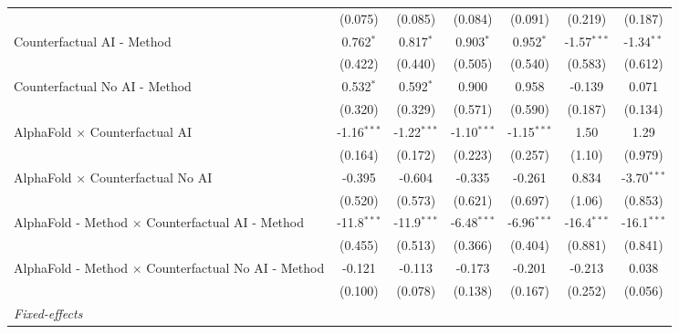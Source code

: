 \begin{tabular}{lcccccc}
                                                              & (0.075)       & (0.085)       & (0.084)       & (0.091)       & (0.219)       & (0.187)\\   
   Counterfactual AI - Method                                 & 0.762$^{*}$   & 0.817$^{*}$   & 0.903$^{*}$   & 0.952$^{*}$   & -1.57$^{***}$ & -1.34$^{**}$\\   
                                                              & (0.422)       & (0.440)       & (0.505)       & (0.540)       & (0.583)       & (0.612)\\   
   Counterfactual No AI - Method                              & 0.532$^{*}$   & 0.592$^{*}$   & 0.900         & 0.958         & -0.139        & 0.071\\   
                                                              & (0.320)       & (0.329)       & (0.571)       & (0.590)       & (0.187)       & (0.134)\\   
   AlphaFold $\times$ Counterfactual AI                       & -1.16$^{***}$ & -1.22$^{***}$ & -1.10$^{***}$ & -1.15$^{***}$ & 1.50          & 1.29\\   
                                                              & (0.164)       & (0.172)       & (0.223)       & (0.257)       & (1.10)        & (0.979)\\   
   AlphaFold $\times$ Counterfactual No AI                    & -0.395        & -0.604        & -0.335        & -0.261        & 0.834         & -3.70$^{***}$\\   
                                                              & (0.520)       & (0.573)       & (0.621)       & (0.697)       & (1.06)        & (0.853)\\   
   AlphaFold - Method $\times$ Counterfactual AI - Method     & -11.8$^{***}$ & -11.9$^{***}$ & -6.48$^{***}$ & -6.96$^{***}$ & -16.4$^{***}$ & -16.1$^{***}$\\   
                                                              & (0.455)       & (0.513)       & (0.366)       & (0.404)       & (0.881)       & (0.841)\\   
   AlphaFold - Method $\times$ Counterfactual No AI - Method  & -0.121        & -0.113        & -0.173        & -0.201        & -0.213        & 0.038\\   
                                                              & (0.100)       & (0.078)       & (0.138)       & (0.167)       & (0.252)       & (0.056)\\   
   \midrule
   \emph{Fixed-effects}\\

\end{tabular}
